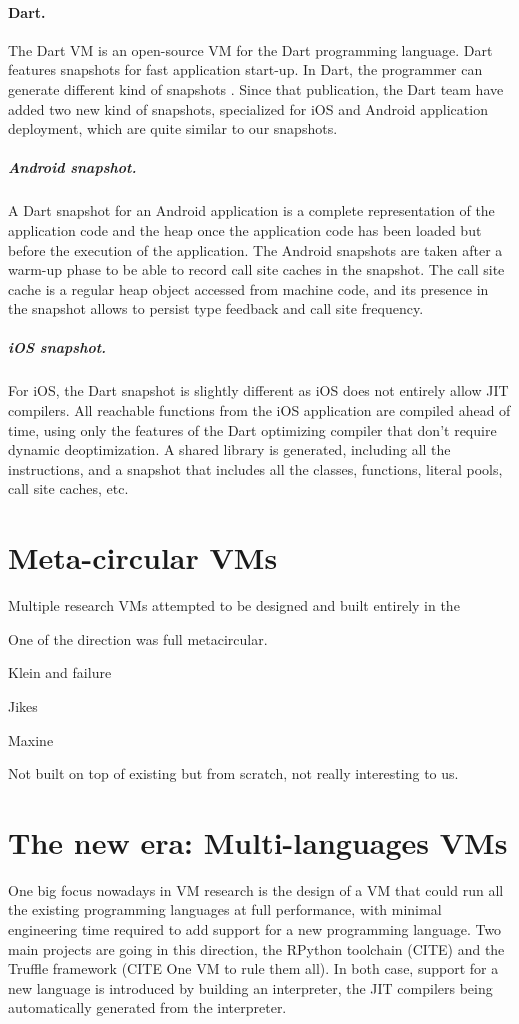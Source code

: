 \documentclass[a4paper,12pt,twoside]{../includes/ThesisStyle}
\begin{document}
\paragraph{Dart.}
The Dart VM is an open-source VM for the Dart programming language. Dart features snapshots for fast application start-up. In Dart, the programmer can generate different kind of snapshots \cite{Anna13a}. Since that publication, the Dart team have added two new kind of snapshots, specialized for iOS and Android application deployment, which are quite similar to our snapshots.

\subparagraph{Android snapshot.} A Dart snapshot for an Android application is a complete representation of the application code and the heap once the application code has been loaded but before the execution of the application. The Android snapshots are taken after a warm-up phase to be able to record call site caches in the snapshot. The call site cache is a regular heap object accessed from machine code, and its presence in the snapshot allows to persist type feedback and call site frequency.

\subparagraph{iOS snapshot.} For iOS, the Dart snapshot is slightly different as iOS does not entirely allow JIT compilers. All reachable functions from the iOS application are compiled ahead of time, using only the features of the Dart optimizing compiler that don't require dynamic deoptimization. A shared library is generated, including all the instructions, and a snapshot that includes all the classes, functions, literal pools, call site caches, etc.

\section{Meta-circular VMs}

Multiple research VMs attempted to be designed and built entirely in the 

One of the direction was full metacircular.

Klein and failure

Jikes

Maxine

Not built on top of existing but from scratch, not really interesting to us.

\section{The new era: Multi-languages VMs}

One big focus nowadays in VM research is the design of a VM that could run all the existing programming languages at full performance, with minimal engineering time required to add support for a new programming language. Two main projects are going in this direction, the RPython toolchain (CITE) and the Truffle framework (CITE One VM to rule them all). In both case, support for a new language is introduced by building an interpreter, the JIT compilers being automatically generated from the interpreter.
\end{document}
